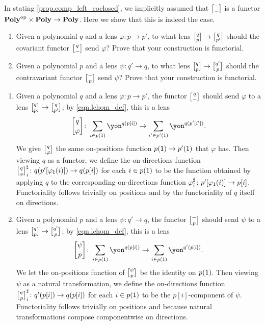 \documentclass[Book-Poly]{subfiles}
\begin{document}
\begin{exercise} \label{exc.lchom_func}
In stating \cref{prop.comp_left_coclosed}, we implicitly assumed that $\lchom{-}{-}$ is a functor $\mathbf{Poly}^{\textnormal{op}}\times\mathbf{Poly}\to\mathbf{Poly}$.
Here we show that this is indeed the case.
\begin{enumerate}
    \item Given a polynomial $q$ and a lens $\varphi\colon p\to p'$, to what lens $\lchom{q}{p}\to\lchom{q}{p'}$ should the covariant functor $\lchom{q}{-}$ send $\varphi$?
    Prove that your construction is functorial.
    
    \item Given a polynomial $p$ and a lens $\psi\colon q'\to q$, to what lens $\lchom{q}{p}\to\lchom{q'}{p}$ should the contravariant functor $\lchom{-}{p}$ send $\psi$?
    Prove that your construction is functorial.
    \qedhere
\end{enumerate}
\begin{solution}
\begin{enumerate}
    \item Given a polynomial $q$ and a lens $\varphi\colon p\to p'$, the functor $\lchom{q}{-}$ should send $\varphi$ to a lens $\lchom{q}{p}\to\lchom{q}{p'}$; by \eqref{eqn.lchom_def}, this is a lens
    \[
        \lchom{q}{\varphi}\colon\sum_{i\in p(\1)}\yon^{q(p[i])}\to\sum_{i'\in p'(\1)}\yon^{q(p'[i'])}.
    \]
    We give $\lchom{q}{\varphi}$ the same on-positions function $p(\textsf{1})\to p'(\textsf{1})$ that $\varphi$ has.
    Then viewing $q$ as a functor, we define the on-directions function $\lchom{q}{\varphi}^\sharp_i\colon q(p'[\varphi_\1(i)])\to q(p[i])$ for each $i\in p(\textsf{1})$ to be the function obtained by applying $q$ to the corresponding on-directions function $\varphi^\sharp_i\colon p'[\varphi_{\textsf{1}}(i)]\to p[i]$.
    Functoriality follows trivially on positions and by the functoriality of $q$ itself on directions.

    \item Given a polynomial $p$ and a lens $\psi\colon q'\to q$, the functor $\lchom{-}{p}$ should send $\psi$ to a lens $\lchom{q}{p}\to\lchom{q'}{p}$; by \eqref{eqn.lchom_def}, this is a lens
    \[
        \lchom{\psi}{p}\colon\sum_{i\in p(\1)}\yon^{q(p[i])}\to\sum_{i\in p(\1)}\yon^{q'(p[i])}.
    \]
    We let the on-positions function of $\lchom{\psi}{p}$ be the identity on $p(\textsf{1})$.
    Then viewing $\psi$ as a natural transformation, we define the on-directions function $\lchom{\psi}{p}^\sharp_i\colon q'(p[i])\to q(p[i])$ for each $i\in p(\textsf{1})$ to be the $p[i]$-component of $\psi$.
    Functoriality follows trivially on positions and because natural transformations compose componentwise on directions.
\end{enumerate}
\end{solution}
\end{exercise}
\end{document}
